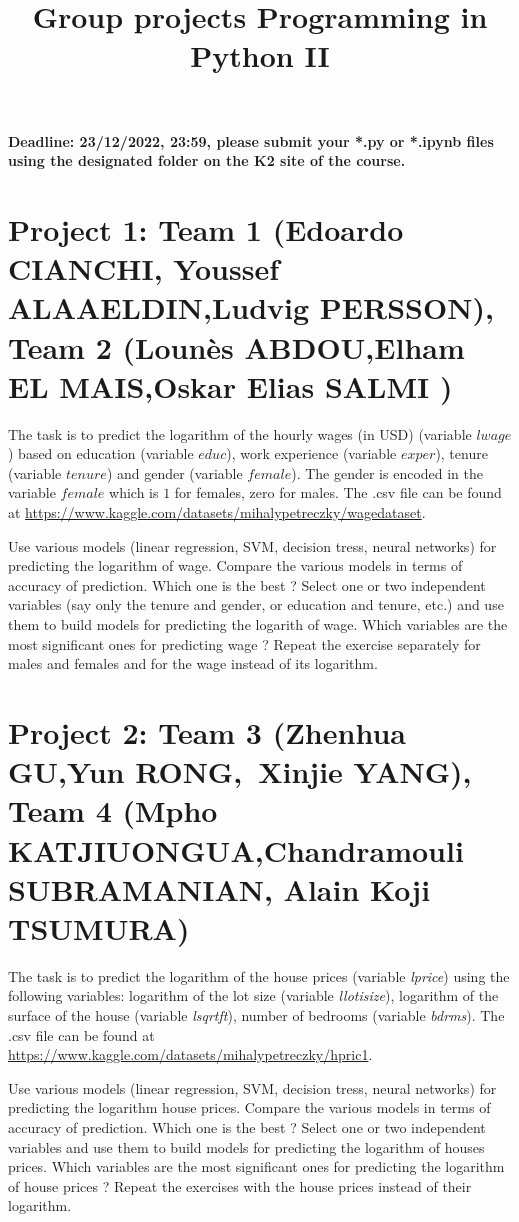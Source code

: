 \documentclass{article}
\title{Group projects Programming in Python II}
\author{}
\date{}
\begin{document}
\maketitle

\textbf{Deadline: 23/12/2022, 23:59,  please submit your *.py or *.ipynb files using the designated folder on the K2 site of the course.}



\section*{Project 1: Team 1 (Edoardo  CIANCHI, Youssef ALAAELDIN,Ludvig PERSSON), Team 2 (Lounès ABDOU,Elham EL MAIS,Oskar Elias SALMI ) }
  The task is to  predict the logarithm of the hourly wages (in USD) (variable $lwage$) based on education (variable $educ$), work experience (variable $exper$), tenure (variable $tenure$) and gender (variable $female$). The gender is encoded in the variable $female$ which is $1$ for   females, zero for males. 
 The .csv file can be found at \url{https://www.kaggle.com/datasets/mihalypetreczky/wagedataset}. 

 Use various models (linear regression, SVM, decision tress, neural networks) for predicting the logarithm of  wage. Compare the various models in terms of accuracy of prediction. Which one is the best ? 
 Select one or two independent variables (say only the tenure and gender, or education and tenure, etc.)  and use them to build models for predicting the logarith of wage. Which variables are the most
 significant ones for predicting  wage ? Repeat the exercise separately for males and females and for the wage instead of its logarithm. 




\section*{Project 2:  Team 3 (Zhenhua GU,Yun RONG, Xinjie YANG), Team 4 (Mpho KATJIUONGUA,Chandramouli SUBRAMANIAN, Alain Koji TSUMURA)}
  The task is to predict the logarithm of the house prices (variable \emph{lprice}) using the following variables:
  logarithm of the lot size (variable \emph{llotisize}), logarithm of the surface of the house (variable \emph{lsqrtft}), number of bedrooms (variable \emph{bdrms}). 	
   The .csv file can be found at \url{https://www.kaggle.com/datasets/mihalypetreczky/hpric1}.  

   Use various models (linear regression, SVM, decision tress, neural networks) for predicting the logarithm house prices. Compare the various models in terms of accuracy of prediction. Which one is the best ? 
 Select one or two independent variables  and use them to build models for predicting the logarithm of houses prices. Which variables are the most
 significant ones for predicting  the logarithm of house prices  ?  Repeat the exercises with the house prices instead of their logarithm. 
 
\end{document}
